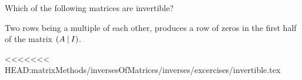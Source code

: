 \documentclass{ximera}
\author{Parisa Fatheddin}
\author{Parisa Fatheddin}
\begin{document}
\begin{exercise}
Which of the following matrices are invertible?

\begin{hint}
Two rows being a multiple of each other, produces a row of zeros in the first half of the matrix $(A \hspace{.08cm}|\hspace{.08cm} I)$.
\end{hint}

\begin{multipleChoice}




\end{multipleChoice}
\end{exercise}































<<<<<<< HEAD:matrixMethods/inversesOfMatrices/inverses/excercises/invertible.tex
\end{document}
